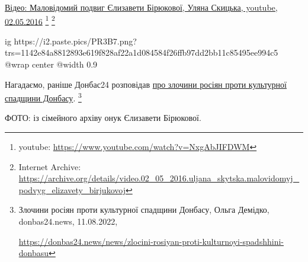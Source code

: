 \href{https://archive.org/details/video.02_05_2016.uljana_skytska.malovidomyj_podvyg_elizavety_birjukovoj}{%
Відео: Маловідомий подвиг Єлизавети Бірюкової, Уляна Скицька, youtube, 02.05.2016}%
\footnote{youtube: \url{https://www.youtube.com/watch?v=NxgAbJIFDWM}} %
\footnote{Internet Archive: \url{https://archive.org/details/video.02_05_2016.uljana_skytska.malovidomyj_podvyg_elizavety_birjukovoj}}

\ifcmt
  ig https://i2.paste.pics/PR3B7.png?trs=1142e84a8812893e619f828af22a1d084584f26ffb97dd2bb11c85495ee994c5
  @wrap center
  @width 0.9
\fi

Нагадаємо, раніше Донбас24 розповідав \href{https://donbas24.news/news/zlocini-rosiyan-proti-kulturnoyi-spadshhini-donbasu}{про злочини росіян проти культурної спадщини Донбасу}.%
\footnote{Злочини росіян проти культурної спадщини Донбасу, Ольга Демідко, donbas24.news, 11.08.2022, \par%
\url{https://donbas24.news/news/zlocini-rosiyan-proti-kulturnoyi-spadshhini-donbasu}%
}

ФОТО: із сімейного архіву онук Єлизавети Бірюкової.

